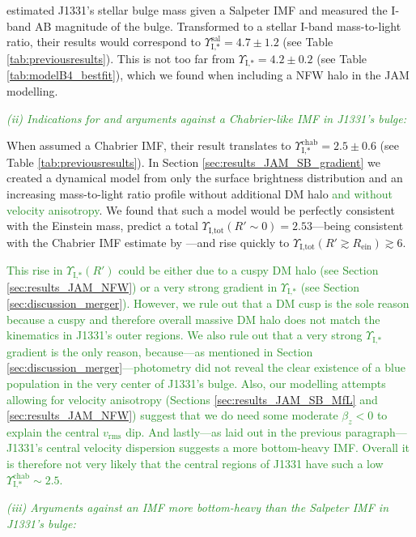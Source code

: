 \documentclass[useAMS,usenatbib]{mnras}
\newcommand{\NEW}[1]{\textcolor{ForestGreen}{#1}}
\begin{document}
\citet{SWELLSI} estimated J1331's stellar bulge mass given a Salpeter IMF and measured the I-band AB magnitude of the bulge. Transformed to a stellar I-band mass-to-light ratio, their results would correspond to $\Upsilon_\text{I,*}^\text{sal} = 4.7 \pm 1.2$ (see Table \ref{tab:previousresults}). This is not too far from $\Upsilon_\text{I,*} = 4.2 \pm 0.2$ (see Table \ref{tab:modelB4_bestfit}), which we found when including a NFW halo in the JAM modelling.

\NEW{\emph{(ii) Indications for and arguments against a Chabrier-like IMF in J1331's bulge:}} 

When \citet{SWELLSI} assumed a Chabrier IMF, their result translates to $\Upsilon_\text{I,*}^\text{chab} = 2.5 \pm 0.6$ (see Table \ref{tab:previousresults}). In Section \ref{sec:results_JAM_SB_gradient} we created a dynamical model from only the surface brightness distribution and an increasing mass-to-light ratio profile without additional DM halo \NEW{and without velocity anisotropy}. We found that such a model would be perfectly consistent with the Einstein mass, predict a total $\Upsilon_\text{I,tot}(R'\sim0) = 2.53$---being consistent with the Chabrier IMF estimate by \citet{SWELLSI}---and rise quickly to $\Upsilon_\text{I,tot}(R'\gtrsim R_\text{ein}) \gtrsim 6$. 

\NEW{This rise in $\Upsilon_\text{I,*}(R')$ could be either due to a cuspy DM halo (see Section \ref{sec:results_JAM_NFW}) or a very strong gradient in $\Upsilon_\text{I,*}$ (see Section \ref{sec:discussion_merger}). However, we rule out that a DM cusp is the sole reason because a cuspy and therefore overall massive DM halo does not match the kinematics in J1331's outer regions. We also rule out that a very strong $\Upsilon_\text{I,*}$ gradient is the only reason, because---as mentioned in Section \ref{sec:discussion_merger}---photometry did not reveal the clear existence of a blue population in the very center of J1331's bulge. Also, our modelling attempts allowing for velocity anisotropy (Sections \ref{sec:results_JAM_SB_MfL} and \ref{sec:results_JAM_NFW}) suggest that we do need some moderate $\beta_z<0$ to explain the central $v_\text{rms}$ dip. And lastly---as laid out in the previous paragraph---J1331's central velocity dispersion suggests a more bottom-heavy IMF. Overall it is therefore not very likely that the central regions of J1331 have such a low $\Upsilon_\text{I,*}^\text{chab} \sim 2.5$.}

\NEW{\emph{(iii) Arguments against an IMF more bottom-heavy than the Salpeter IMF in J1331's bulge:}} 
\end{document}
